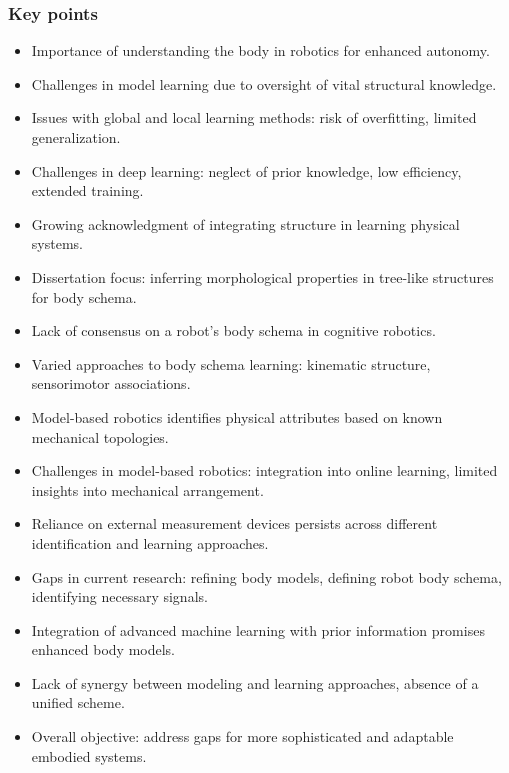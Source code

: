 \documentclass[12pt, a4paper]{article}
\begin{document}
\subsubsection*{Key points}
\begin{itemize}
	\item Importance of understanding the body in robotics for enhanced autonomy.
	\item Challenges in model learning due to oversight of vital structural knowledge.
	\item Issues with global and local learning methods: risk of overfitting, limited generalization.
	\item Challenges in deep learning: neglect of prior knowledge, low efficiency, extended training.
	\item Growing acknowledgment of integrating structure in learning physical systems.
	\item Dissertation focus: inferring morphological properties in tree-like structures for body schema.
	\item Lack of consensus on a robot's body schema in cognitive robotics.
	\item Varied approaches to body schema learning: kinematic structure, sensorimotor associations.
	\item Model-based robotics identifies physical attributes based on known mechanical topologies.
	\item Challenges in model-based robotics: integration into online learning, limited insights into mechanical arrangement.
	\item Reliance on external measurement devices persists across different identification and learning approaches.
	\item Gaps in current research: refining body models, defining robot body schema, identifying necessary signals.
	\item Integration of advanced machine learning with prior information promises enhanced body models.
	\item Lack of synergy between modeling and learning approaches, absence of a unified scheme.
	\item Overall objective: address gaps for more sophisticated and adaptable embodied systems.
\end{itemize}
\end{document}
